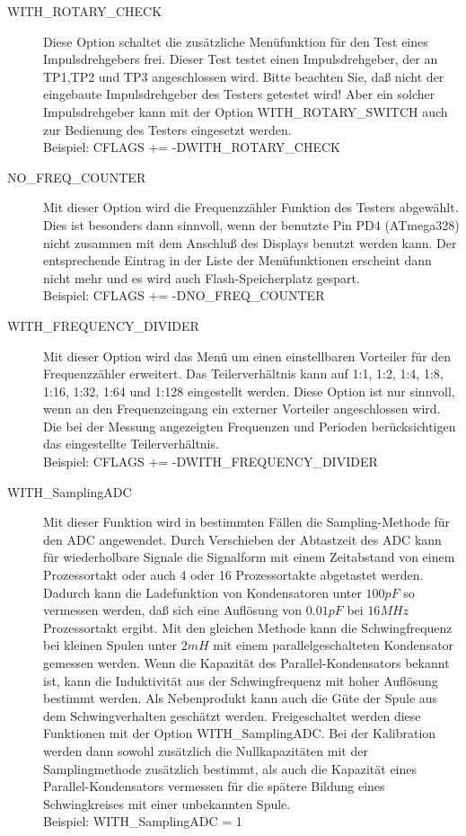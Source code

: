 \begin{description}
 \item[WITH\_ROTARY\_CHECK]
Diese Option schaltet die zusätzliche Menüfunktion für den Test eines Impulsdrehgebers frei.
Dieser Test testet einen Impulsdrehgeber, der an TP1,TP2 und TP3 angeschlossen wird.
Bitte beachten Sie, daß nicht der eingebaute Impulsdrehgeber des Testers getestet wird!
Aber ein solcher Impulsdrehgeber kann mit der Option WITH\_ROTARY\_SWITCH auch zur Bedienung des Testers eingesetzt werden.\\
Beispiel: CFLAGS += -DWITH\_ROTARY\_CHECK

 \item[NO\_FREQ\_COUNTER]
Mit dieser Option wird die Frequenzzähler Funktion des Testers abgewählt.
Dies ist besonders dann sinnvoll, wenn der benutzte Pin PD4 (ATmega328) nicht zusammen mit
dem Anschluß des Displays benutzt werden kann.
Der entsprechende Eintrag in der Liste der Menüfunktionen erscheint dann nicht mehr und es
wird auch Flash-Speicherplatz gespart.\\
Beispiel: CFLAGS += -DNO\_FREQ\_COUNTER

 \item[WITH\_FREQUENCY\_DIVIDER]
Mit dieser Option wird das Menü um einen einstellbaren Vorteiler für den Frequenzzähler erweitert.
Das Teilerverhältnis kann auf 1:1, 1:2, 1:4, 1:8, 1:16, 1:32, 1:64 und 1:128 eingestellt werden.
Diese Option ist nur sinnvoll, wenn an den Frequenzeingang ein externer Vorteiler angeschlossen wird.
Die bei der Messung angezeigten Frequenzen und Perioden berücksichtigen das eingestellte Teilerverhältnis.\\
Beispiel: CFLAGS += -DWITH\_FREQUENCY\_DIVIDER

  \item[WITH\_SamplingADC] Mit dieser Funktion wird in bestimmten Fällen die Sampling-Methode für den ADC angewendet.
Durch Verschieben der Abtastzeit des ADC kann für wiederholbare Signale die Signalform mit einem Zeitabstand
von einem Prozessortakt oder auch 4 oder 16 Prozessortakte abgetastet werden. Dadurch kann die Ladefunktion von
Kondensatoren unter \(100pF\) so vermessen werden, daß sich eine Auflösung von \(0.01pF\) bei \(16MHz\) Prozessortakt ergibt.
Mit den gleichen Methode kann die Schwingfrequenz bei kleinen Spulen unter \(2mH\) mit einem parallelgeschalteten
Kondensator gemessen werden. Wenn die Kapazität des Parallel-Kondensators bekannt ist, kann die Induktivität aus
der Schwingfrequenz mit hoher Auflösung bestimmt werden. Als Nebenprodukt kann auch die Güte der Spule aus dem
Schwingverhalten geschätzt werden. Freigeschaltet werden diese Funktionen mit der Option WITH\_SamplingADC.
Bei der Kalibration werden dann sowohl zusätzlich die Nullkapazitäten mit der Samplingmethode zusätzlich bestimmt,
als auch die Kapazität eines Parallel-Kondensators vermessen für die spätere Bildung eines Schwingkreises mit einer unbekannten Spule.\\
Beispiel: WITH\_SamplingADC = 1


\end{description}
